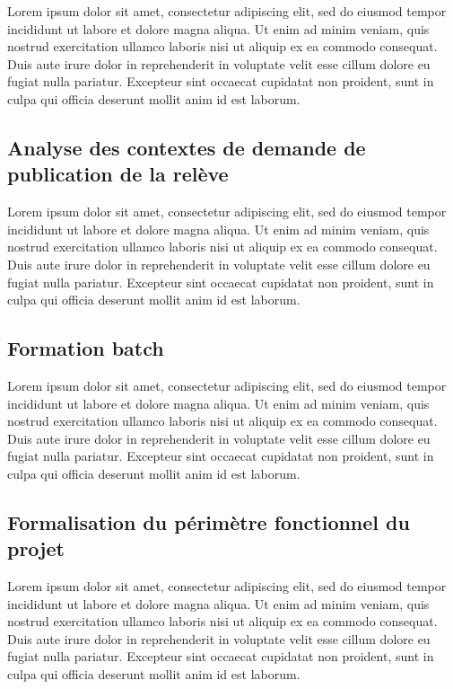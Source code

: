 \documentclass[a4paper, 12pt]{report}
\begin{document}
Lorem ipsum dolor sit amet, consectetur adipiscing elit, sed do eiusmod tempor incididunt ut labore et dolore magna aliqua. Ut enim ad minim veniam, quis nostrud exercitation ullamco laboris nisi ut aliquip ex ea commodo consequat. Duis aute irure dolor in reprehenderit in voluptate velit esse cillum dolore eu fugiat nulla pariatur. Excepteur sint occaecat cupidatat non proident, sunt in culpa qui officia deserunt mollit anim id est laborum.

\subsection{Analyse des contextes de demande de publication de la relève}

Lorem ipsum dolor sit amet, consectetur adipiscing elit, sed do eiusmod tempor incididunt ut labore et dolore magna aliqua. Ut enim ad minim veniam, quis nostrud exercitation ullamco laboris nisi ut aliquip ex ea commodo consequat. Duis aute irure dolor in reprehenderit in voluptate velit esse cillum dolore eu fugiat nulla pariatur. Excepteur sint occaecat cupidatat non proident, sunt in culpa qui officia deserunt mollit anim id est laborum.

\subsection{Formation batch}

Lorem ipsum dolor sit amet, consectetur adipiscing elit, sed do eiusmod tempor incididunt ut labore et dolore magna aliqua. Ut enim ad minim veniam, quis nostrud exercitation ullamco laboris nisi ut aliquip ex ea commodo consequat. Duis aute irure dolor in reprehenderit in voluptate velit esse cillum dolore eu fugiat nulla pariatur. Excepteur sint occaecat cupidatat non proident, sunt in culpa qui officia deserunt mollit anim id est laborum.

\subsection{Formalisation du périmètre fonctionnel du projet}

Lorem ipsum dolor sit amet, consectetur adipiscing elit, sed do eiusmod tempor incididunt ut labore et dolore magna aliqua. Ut enim ad minim veniam, quis nostrud exercitation ullamco laboris nisi ut aliquip ex ea commodo consequat. Duis aute irure dolor in reprehenderit in voluptate velit esse cillum dolore eu fugiat nulla pariatur. Excepteur sint occaecat cupidatat non proident, sunt in culpa qui officia deserunt mollit anim id est laborum.
\end{document}
